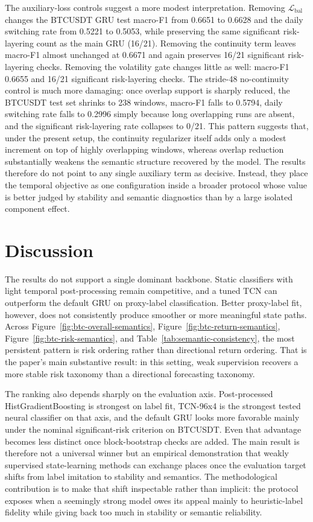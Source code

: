 \documentclass[a4paper,fleqn]{cas-dc}
\begin{document}
The auxiliary-loss controls suggest a more modest interpretation. Removing $\mathcal{L}_{\mathrm{bal}}$ changes the BTCUSDT GRU test macro-F1 from 0.6651 to 0.6628 and the daily switching rate from 0.5221 to 0.5053, while preserving the same significant risk-layering count as the main GRU (16/21). Removing the continuity term leaves macro-F1 almost unchanged at 0.6671 and again preserves 16/21 significant risk-layering checks. Removing the volatility gate changes little as well: macro-F1 0.6655 and 16/21 significant risk-layering checks. The stride-48 no-continuity control is much more damaging: once overlap support is sharply reduced, the BTCUSDT test set shrinks to 238 windows, macro-F1 falls to 0.5794, daily switching rate falls to 0.2996 simply because long overlapping runs are absent, and the significant risk-layering rate collapses to 0/21. This pattern suggests that, under the present setup, the continuity regularizer itself adds only a modest increment on top of highly overlapping windows, whereas overlap reduction substantially weakens the semantic structure recovered by the model. The results therefore do not point to any single auxiliary term as decisive. Instead, they place the temporal objective as one configuration inside a broader protocol whose value is better judged by stability and semantic diagnostics than by a large isolated component effect.

\section{Discussion}
The results do not support a single dominant backbone. Static classifiers with light temporal post-processing remain competitive, and a tuned TCN can outperform the default GRU on proxy-label classification. Better proxy-label fit, however, does not consistently produce smoother or more meaningful state paths. Across Figure~\ref{fig:btc-overall-semantics}, Figure~\ref{fig:btc-return-semantics}, Figure~\ref{fig:btc-risk-semantics}, and Table~\ref{tab:semantic-consistency}, the most persistent pattern is risk ordering rather than directional return ordering. That is the paper's main substantive result: in this setting, weak supervision recovers a more stable risk taxonomy than a directional forecasting taxonomy.

The ranking also depends sharply on the evaluation axis. Post-processed HistGradientBoosting is strongest on label fit, TCN-96x4 is the strongest tested neural classifier on that axis, and the default GRU looks more favorable mainly under the nominal significant-risk criterion on BTCUSDT. Even that advantage becomes less distinct once block-bootstrap checks are added. The main result is therefore not a universal winner but an empirical demonstration that weakly supervised state-learning methods can exchange places once the evaluation target shifts from label imitation to stability and semantics. The methodological contribution is to make that shift inspectable rather than implicit: the protocol exposes when a seemingly strong model owes its appeal mainly to heuristic-label fidelity while giving back too much in stability or semantic reliability.
\end{document}
